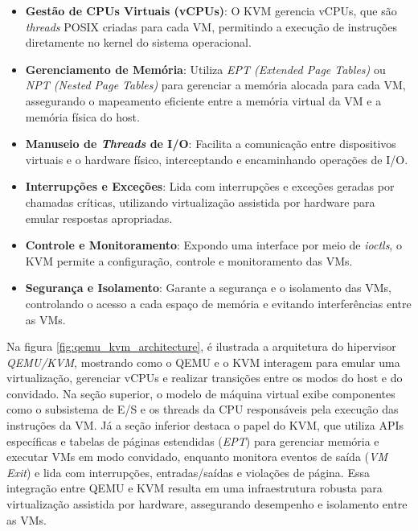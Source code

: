 \begin{itemize}
    \item \textbf{Gestão de CPUs Virtuais (vCPUs)}: O KVM gerencia vCPUs, que são \textit{threads} POSIX criadas para cada VM, permitindo a execução de instruções diretamente no kernel do sistema operacional.
  
    \item \textbf{Gerenciamento de Memória}: Utiliza \textit{EPT (Extended Page Tables)} ou \textit{NPT (Nested Page Tables)} para gerenciar a memória alocada para cada VM, assegurando o mapeamento eficiente entre a memória virtual da VM e a memória física do host.

    \item \textbf{Manuseio de \textit{Threads} de I/O}: Facilita a comunicação entre dispositivos virtuais e o hardware físico, interceptando e encaminhando operações de I/O.

    \item \textbf{Interrupções e Exceções}: Lida com interrupções e exceções geradas por chamadas críticas, utilizando virtualização assistida por hardware para emular respostas apropriadas.

    \item \textbf{Controle e Monitoramento}: Expondo uma interface por meio de \textit{ioctls}, o KVM permite a configuração, controle e monitoramento das VMs.

    \item \textbf{Segurança e Isolamento}: Garante a segurança e o isolamento das VMs, controlando o acesso a cada espaço de memória e evitando interferências entre as VMs.
\end{itemize}

Na figura \ref{fig:qemu_kvm_architecture}, é ilustrada a arquitetura do hipervisor \textit{QEMU/KVM}, mostrando como o QEMU e o KVM interagem para emular uma virtualização, gerenciar vCPUs e realizar transições entre os modos do host e do convidado. Na seção superior, o modelo de máquina virtual exibe componentes como o subsistema de E/S e os threads da CPU responsáveis pela execução das instruções da VM. Já a seção inferior destaca o papel do KVM, que utiliza APIs específicas e tabelas de páginas estendidas (\textit{EPT}) para gerenciar memória e executar VMs em modo convidado, enquanto monitora eventos de saída (\textit{VM Exit}) e lida com interrupções, entradas/saídas e violações de página. Essa integração entre QEMU e KVM resulta em uma infraestrutura robusta para virtualização assistida por hardware, assegurando desempenho e isolamento entre as VMs.

